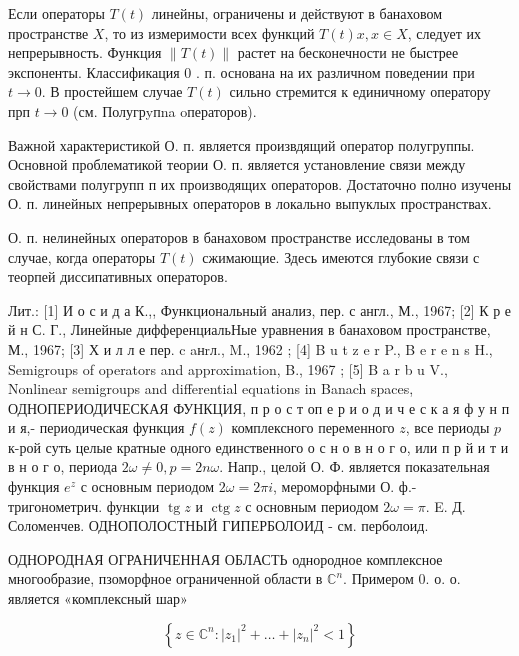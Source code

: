 \documentclass[10pt]{article}
\begin{document}
Если операторы $T(t)$ линейны, ограничены и действуют в банаховом пространстве $X$, то из измеримости всех функций $T(t) x, x \in X$, следует их непрерывность. Функция $\|T(t)\|$ растет на бесконечности не быстрее экспоненты. Классификация 0 . п. основана на их различном поведении при $t \rightarrow 0$. В простейшем случае $T(t)$ сильно стремится к единичному оператору прп $t \rightarrow 0$ (см. Полугрyпna oператоров).



Важной характеристикой О. п. является произвдящий оператор полугруппы. Основной проблематикой теории О. п. является установление связи между свойствами полугрупп п их производящих операторов. Достаточно полно изучены О. п. линейных непрерывных операторов в локально выпуклых пространствах.



О. п. нелинейных операторов в банаховом пространстве исследованы в том случае, когда операторы $T(t)$ сжимающие. Здесь имеются глубокие связи с теорпей диссипативных операторов.



Лит.: [1] И о с и д а К.,, Функциональный анализ, пер. с англ., М., 1967; [2] К р е й н С. Г., Линейные дифференциальНые уравнения в банаховом пространстве, М., 1967; [3] Х и л л е пер. c aнrл., M., 1962 ; [4] B u t z e r P., B e r e n s H., Semigroups of operators and approximation, B., 1967 ; [5] B a r b u V., Nonlinear semigroups and differential equations in Banach spaces, ОДНОПЕРИОДИЧЕСКАЯ ФУНКЦИЯ, п р о с т оп е р и о д и ч е с к а я ф у н п и я,- периодическая функция $f(z)$ комплексного переменного $z$, все периоды $p$ к-рой суть целые кратные одного единственного о с н о в н о г о, или п р й и т и в н о г о, периода $2 \omega \neq 0, p=2 n \omega$. Напр., целой О. Ф. является показательная функция $e^{z}$ с основным периодом $2 \omega=2 \pi i$, мероморфными О. ф.- тригонометрич. функции $\operatorname{tg} z$ и $\operatorname{ctg} z$ с основным периодом $2 \omega=\pi$. E. Д. Соломенчев. ОДНОПОЛОСТНЫЙ ГИПЕРБОЛОИД - см. перболоид.



ОДНОРОДНАЯ ОГРАНИЧЕННАЯ ОБЛАСТЬ однородное комплексное многообразие, пзоморфное ограниченной области в $\mathbb{C}^{n}$. Примером 0. о. о. является «комплексный шар»



\[

\left\{z \in \mathbb{C}^{n}:\left|z_{1}\right|^{2}+\ldots+\left|z_{n}\right|^{2}<1\right\}

\]
\end{document}
